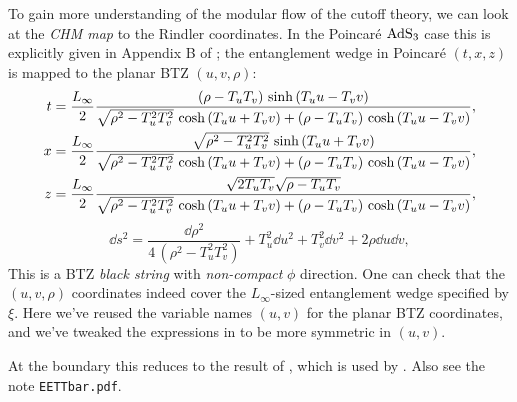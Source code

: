 \documentclass[11pt,a4paper]{article}
\begin{document}
%	
	
	To gain more understanding of the modular flow of the cutoff theory, we can look at the \textit{CHM map} \cite{Casini:2011kv} to the Rindler coordinates. In the Poincar\'e $\mathrm{AdS}_3$ case this is explicitly given in Appendix B of \cite{Song:2016gtd}; the entanglement wedge in Poincar\'e $(t,x,z)$ is mapped to the planar BTZ $(u,v,\rho)$:
	\begin{equation}
	\begin{aligned}
		t &= \frac{L_\infty}{2} \frac{
				\pqty{\rho - T_u T_v}
				\,\sinh\,(T_u u - T_v v)
			}{
				\sqrt{\rho^2 - T_u^2 T_v^2}
					\,\cosh\,(T_u u + T_v v)
				+ \pqty{\rho - T_u T_v}
					\,\cosh\,(T_u u - T_v v)
			},
	\\
		x &= \frac{L_\infty}{2} \frac{
				\sqrt{\rho^2 - T_u^2 T_v^2}
				\,\sinh\,(T_u u + T_v v)
			}{
				\sqrt{\rho^2 - T_u^2 T_v^2}
					\,\cosh\,(T_u u + T_v v)
				+ \pqty{\rho - T_u T_v}
					\,\cosh\,(T_u u - T_v v)
			},
	\\
		z &= \frac{L_\infty}{2} \frac{
				\sqrt{2T_u T_v}
				\sqrt{\rho - T_u T_v}
			}{
				\sqrt{\rho^2 - T_u^2 T_v^2}
					\,\cosh\,(T_u u + T_v v)
				+ \pqty{\rho - T_u T_v}
					\,\cosh\,(T_u u - T_v v)
			},
	\end{aligned}
	\label{eq:poincare2btz}
	\end{equation}
	\begin{equation}
		\dd{s}^2
		= \frac{\dd{\rho}^2}{4\,(\rho^2 - T_u^2 T_v^2)}
			+ T_u^2 \dd{u}^2
			+ T_v^2 \dd{v}^2
			+ 2\rho \dd{u} \dd{v},
	\end{equation}
	This is a BTZ \textit{black string} with \textit{non-compact} $\phi$ direction. 
	One can check that the $(u,v,\rho)$ coordinates indeed cover the $L_\infty$-sized entanglement wedge specified by $\xi$. 
	Here we've reused the variable names $(u,v)$ for the planar BTZ coordinates, and we've tweaked the expressions in \cite{Song:2016gtd} to be more symmetric in $(u,v)$. 
	
	\noindent{} At the boundary this reduces to the result of \textcite{Casini:2011kv}, which is used by \textcite{Lewkowycz:2019xse}. Also see the note \texttt{EETTbar.pdf}. 
	
\end{document}
